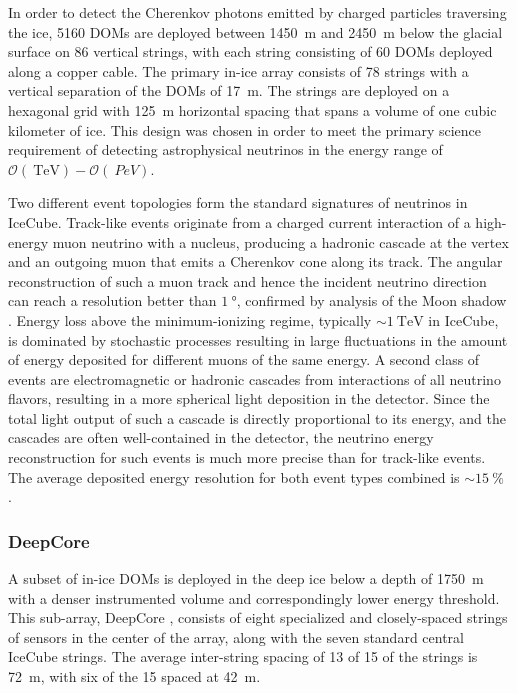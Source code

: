 In order to detect the Cherenkov photons emitted by charged particles
traversing the ice, \num{5160} DOMs are deployed between \SI{1450}{\meter}
and \SI{2450} {\meter} below the glacial surface on \num{86} vertical
strings, with each string consisting of \num{60} DOMs deployed along a copper cable. The
primary in-ice array consists of \num{78} strings with a vertical
separation of the DOMs of \SI{17}{\meter}.  The strings are
deployed on a hexagonal grid with \SI{125}{\meter} horizontal spacing that
spans a volume of one cubic kilometer of ice.  This design was chosen in
order to meet the primary science requirement of detecting astrophysical
neutrinos in the energy range of $\mathcal{O}(\SI{}{\tera\electronvolt}) -
\mathcal{O}(\SI{}{PeV})$.  %

Two different event topologies form the standard signatures of neutrinos in
IceCube.  Track-like events originate from a charged current interaction of
a high-energy muon neutrino with a nucleus, producing a hadronic cascade at
the vertex and an outgoing muon that emits a Cherenkov cone along its
track.  The angular reconstruction of such a muon track and hence the
incident neutrino direction can reach a resolution better than
$\SI{1}{\degree}$, confirmed by analysis of the Moon shadow
\cite{IC3:moon}. Energy loss above the minimum-ionizing regime, typically $ \sim
\SI{1}{\tera\electronvolt}$ in IceCube, is dominated by stochastic
processes resulting in large fluctuations in the amount of energy deposited
for different muons of the same energy.  A second class of events are
electromagnetic or hadronic cascades from interactions of all neutrino
flavors, resulting in a more spherical light deposition in the detector.
Since the total light output of such a cascade is directly proportional to its energy, and
the cascades are often well-contained in the detector, the neutrino energy
reconstruction for such events is much more precise than for track-like
events. The average deposited energy resolution for both event types
combined is $ \sim \SI{15}{\%}$ \cite{IC3:ereco}.

\subsubsection{DeepCore}

A subset of in-ice DOMs is deployed in the deep ice below a
depth of \SI{1750}{\meter} with a denser instrumented volume and
correspondingly lower energy threshold. This
sub-array, DeepCore \cite{ICECUBE:DC}, consists of eight specialized and
closely-spaced strings of sensors in the center of the array, along with
the seven standard central IceCube strings.  The average inter-string
spacing of 13 of 15 of the strings is \SI{72}{\meter}, with six of the 15
spaced at \SI{42}{\meter}.

